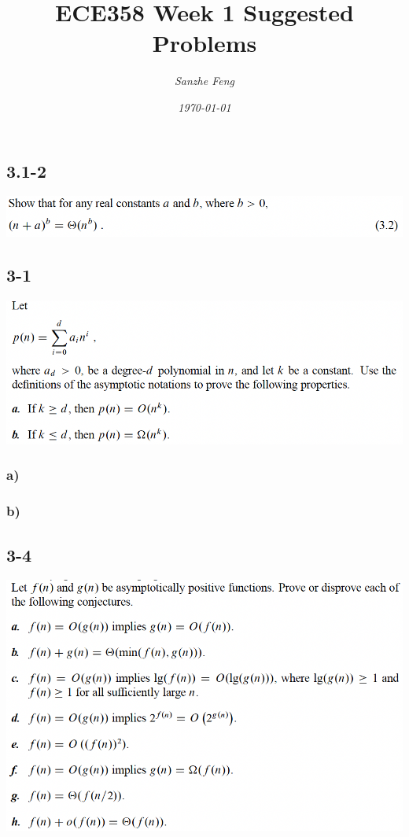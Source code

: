 \documentclass{article}
\begin{document}
\begin{titlepage}
	

\title{\textbf{ECE358 Week 1 Suggested Problems}}
\author{\textit{Sanzhe Feng}}
\date{\textit{\today}}
\maketitle
\end{titlepage}
\setlength{\parindent}{0pt}

\subsection*{3.1-2}
\includegraphics[width=1\linewidth]{W1PS_3.1-2.png}
\subsection*{3-1}
\includegraphics[width=1\linewidth]{W1PS_3-1.png}
\subsubsection*{a)}
\subsubsection*{b)}

\subsection*{3-4}
\includegraphics[width=1\linewidth]{W1PS_3-4.png}
\end{document}
